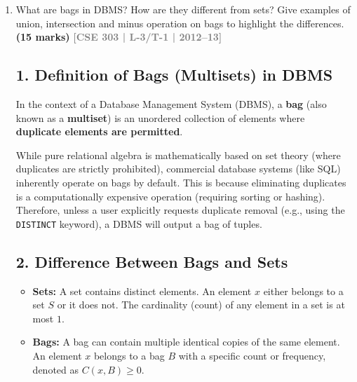 \documentclass[12pt,a3paper]{article}
\newcommand{\yr}[1]{\hfill\textcolor{gray}{\small\textbf{[#1]}}}
\newcommand{\mk}[1]{\textcolor{orange!70!black}{\small\textbf{(#1 marks)}}}
\begin{document}
\begin{enumerate}
\begin{tcolorbox}[enhanced,breakable,ansbox,colback=cA!4,colframe=cA,boxrule=0.8pt,arc=5pt,title={\textbf{Answer}},fonttitle=\bfseries\color{white},colbacktitle=cA]
\end{tcolorbox}

\item What are bags in DBMS? How are they different from sets? Give examples of union, intersection and minus operation on bags to highlight the differences.
\mk{15} \yr{CSE 303 | L-3/T-1 | 2012--13}

\begin{tcolorbox}[enhanced,breakable,ansbox,colback=cA!4,colframe=cA,boxrule=0.8pt,arc=5pt,title={\textbf{Answer}},fonttitle=\bfseries\color{white},colbacktitle=cA]

\subsection*{1. Definition of Bags (Multisets) in DBMS}

In the context of a Database Management System (DBMS), a \textbf{bag} (also known as a \textbf{multiset}) is an unordered collection of elements where \textbf{duplicate elements are permitted}. 

While pure relational algebra is mathematically based on set theory (where duplicates are strictly prohibited), commercial database systems (like SQL) inherently operate on bags by default. This is because eliminating duplicates is a computationally expensive operation (requiring sorting or hashing). Therefore, unless a user explicitly requests duplicate removal (e.g., using the \texttt{DISTINCT} keyword), a DBMS will output a bag of tuples.

\subsection*{2. Difference Between Bags and Sets}

\begin{itemize}
    \item \textbf{Sets:} A set contains distinct elements. An element $x$ either belongs to a set $S$ or it does not. The cardinality (count) of any element in a set is at most $1$.
    \item \textbf{Bags:} A bag can contain multiple identical copies of the same element. An element $x$ belongs to a bag $B$ with a specific count or frequency, denoted as $C(x, B) \geq 0$.
\end{itemize}

\vspace{1em}
\begin{center}
\end{center}
\end{tcolorbox}
\end{enumerate}
\end{document}
